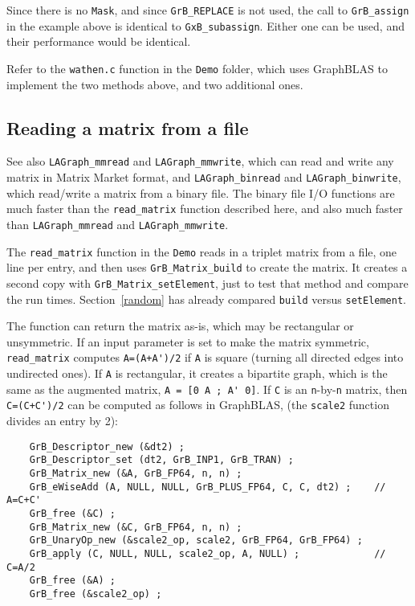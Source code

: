 \documentclass[12pt]{article}
\begin{document}
Since there is no \verb'Mask', and since \verb'GrB_REPLACE' is not used, the call
to \verb'GrB_assign' in the example above is identical to \verb'GxB_subassign'.
Either one can be used, and their performance would be identical.

Refer to the \verb'wathen.c' function in the \verb'Demo' folder, which
uses GraphBLAS to implement the two methods above, and two additional ones.

\subsection{Reading a matrix from a file}
\label{read}

See also \verb'LAGraph_mmread' and \verb'LAGraph_mmwrite', which
can read and write any matrix in Matrix Market format, and
\verb'LAGraph_binread' and \verb'LAGraph_binwrite', which read/write a matrix
from a binary file.  The binary file I/O functions are much faster than
the \verb'read_matrix' function described here, and also much faster than
\verb'LAGraph_mmread' and \verb'LAGraph_mmwrite'.

The \verb'read_matrix' function in the \verb'Demo' reads in a triplet matrix
from a file, one line per entry, and then uses \verb'GrB_Matrix_build' to
create the matrix.  It creates a second copy with \verb'GrB_Matrix_setElement',
just to test that method and compare the run times.
Section~\ref{random} has already compared
\verb'build' versus \verb'setElement'.

The function can return the matrix as-is, which may be rectangular or
unsymmetric.  If an input parameter is set to make the matrix symmetric,
\verb'read_matrix' computes \verb"A=(A+A')/2" if \verb'A' is square (turning
all directed edges into undirected ones).  If \verb'A' is rectangular, it
creates a bipartite graph, which is the same as the augmented matrix,
\verb"A = [0 A ; A' 0]".
If \verb'C' is an \verb'n'-by-\verb'n' matrix, then \verb"C=(C+C')/2" can be
computed as follows in GraphBLAS, (the \verb'scale2' function divides an entry
by 2):

    \vspace{-0.05in}
    {\footnotesize
    \begin{verbatim}
    GrB_Descriptor_new (&dt2) ;
    GrB_Descriptor_set (dt2, GrB_INP1, GrB_TRAN) ;
    GrB_Matrix_new (&A, GrB_FP64, n, n) ;
    GrB_eWiseAdd (A, NULL, NULL, GrB_PLUS_FP64, C, C, dt2) ;    // A=C+C'
    GrB_free (&C) ;
    GrB_Matrix_new (&C, GrB_FP64, n, n) ;
    GrB_UnaryOp_new (&scale2_op, scale2, GrB_FP64, GrB_FP64) ;
    GrB_apply (C, NULL, NULL, scale2_op, A, NULL) ;             // C=A/2
    GrB_free (&A) ;
    GrB_free (&scale2_op) ; \end{verbatim}}
\end{document}
